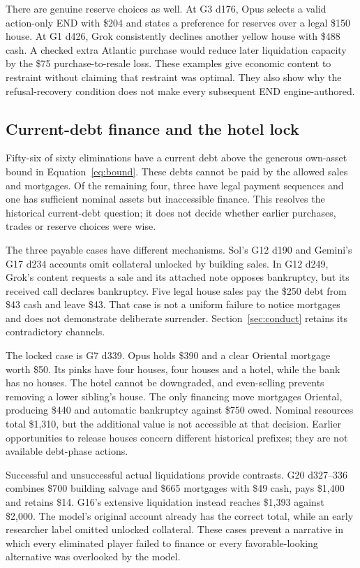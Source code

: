 There are genuine reserve choices as well. At G3 d176, Opus selects a valid action-only END with \$204 and states a preference for reserves over a legal \$150 house. At G1 d426, Grok consistently declines another yellow house with \$488 cash. A checked extra Atlantic purchase would reduce later liquidation capacity by the \$75 purchase-to-resale loss. These examples give economic content to restraint without claiming that restraint was optimal. They also show why the refusal-recovery condition does not make every subsequent END engine-authored.

\subsection{Current-debt finance and the hotel lock}

Fifty-six of sixty eliminations have a current debt above the generous own-asset bound in Equation~\ref{eq:bound}. These debts cannot be paid by the allowed sales and mortgages. Of the remaining four, three have legal payment sequences and one has sufficient nominal assets but inaccessible finance. This resolves the historical current-debt question; it does not decide whether earlier purchases, trades or reserve choices were wise.

The three payable cases have different mechanisms. Sol's G12 d190 and Gemini's G17 d234 accounts omit collateral unlocked by building sales. In G12 d249, Grok's content requests a sale and its attached note opposes bankruptcy, but its received call declares bankruptcy. Five legal house sales pay the \$250 debt from \$43 cash and leave \$43. That case is not a uniform failure to notice mortgages and does not demonstrate deliberate surrender. Section~\ref{sec:conduct} retains its contradictory channels.

The locked case is G7 d339. Opus holds \$390 and a clear Oriental mortgage worth \$50. Its pinks have four houses, four houses and a hotel, while the bank has no houses. The hotel cannot be downgraded, and even-selling prevents removing a lower sibling's house. The only financing move mortgages Oriental, producing \$440 and automatic bankruptcy against \$750 owed. Nominal resources total \$1,310, but the additional value is not accessible at that decision. Earlier opportunities to release houses concern different historical prefixes; they are not available debt-phase actions.

Successful and unsuccessful actual liquidations provide contrasts. G20 d327--336 combines \$700 building salvage and \$665 mortgages with \$49 cash, pays \$1,400 and retains \$14. G16's extensive liquidation instead reaches \$1,393 against \$2,000. The model's original account already has the correct total, while an early researcher label omitted unlocked collateral. These cases prevent a narrative in which every eliminated player failed to finance or every favorable-looking alternative was overlooked by the model.

